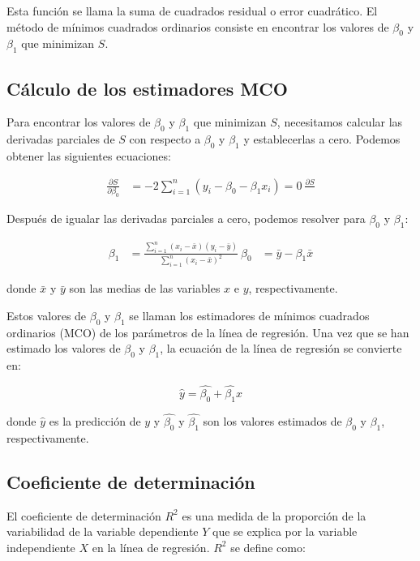 \documentclass{article}
\begin{document}
Esta función se llama la suma de cuadrados residual o error cuadrático. El método de mínimos cuadrados ordinarios consiste en encontrar los valores de $\beta_0$ y $\beta_1$ que minimizan $S$.

\subsection{Cálculo de los estimadores MCO}

Para encontrar los valores de $\beta_0$ y $\beta_1$ que minimizan $S$, necesitamos calcular las derivadas parciales de $S$ con respecto a $\beta_0$ y $\beta_1$ y establecerlas a cero. Podemos obtener las siguientes ecuaciones:

\begin{align}
\frac{\partial S}{\partial \beta_0} &= -2 \sum_{i=1}^n (y_i - \beta_0 - \beta_1 x_i) = 0 \
\frac{\partial S}{}
\end{align}

Después de igualar las derivadas parciales a cero, podemos resolver para $\beta_0$ y $\beta_1$:

\begin{align}
\beta_1 &= \frac{\sum_{i=1}^n (x_i - \bar{x})(y_i - \bar{y})}{\sum_{i=1}^n (x_i - \bar{x})^2} \
\beta_0 &= \bar{y} - \beta_1 \bar{x}
\end{align}

donde $\bar{x}$ y $\bar{y}$ son las medias de las variables $x$ e $y$, respectivamente.

Estos valores de $\beta_0$ y $\beta_1$ se llaman los estimadores de mínimos cuadrados ordinarios (MCO) de los parámetros de la línea de regresión. Una vez que se han estimado los valores de $\beta_0$ y $\beta_1$, la ecuación de la línea de regresión se convierte en:

\begin{equation}
\hat{y} = \hat{\beta_0} + \hat{\beta_1} x
\end{equation}

donde $\hat{y}$ es la predicción de $y$ y $\hat{\beta_0}$ y $\hat{\beta_1}$ son los valores estimados de $\beta_0$ y $\beta_1$, respectivamente.

\subsection{Coeficiente de determinación}

El coeficiente de determinación $R^2$ es una medida de la proporción de la variabilidad de la variable dependiente $Y$ que se explica por la variable independiente $X$ en la línea de regresión. $R^2$ se define como:
\end{document}
